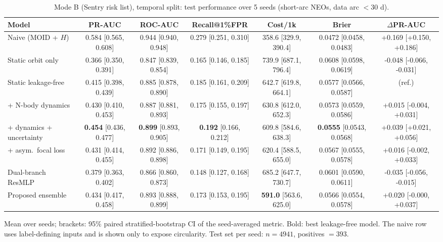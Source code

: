 \begin{table}[t]
\centering
\small
\caption{Mode B (Sentry risk list), temporal split: test performance over 5 seeds (short-arc NEOs, data arc $<30$ d).}
\label{tab:sentry_temporal_short_arc}
\begin{tabular}{lcccccc}
\toprule
Model & PR-AUC & ROC-AUC & Recall@1\%FPR & Cost/1k & Brier & $\Delta$PR-AUC \\
\midrule
Naive (MOID + $H$) & 0.584 \scriptsize{[0.565, 0.608]} & 0.944 \scriptsize{[0.940, 0.948]} & 0.279 \scriptsize{[0.251, 0.310]} & 358.6 \scriptsize{[329.9, 390.4]} & 0.0472 \scriptsize{[0.0458, 0.0483]} & +0.169 \scriptsize{[+0.150, +0.186]} \\
\midrule
Static orbit only & 0.366 \scriptsize{[0.350, 0.391]} & 0.847 \scriptsize{[0.839, 0.854]} & 0.165 \scriptsize{[0.146, 0.185]} & 739.9 \scriptsize{[687.1, 796.4]} & 0.0608 \scriptsize{[0.0598, 0.0619]} & -0.048 \scriptsize{[-0.066, -0.031]} \\
Static leakage-free & 0.415 \scriptsize{[0.398, 0.439]} & 0.885 \scriptsize{[0.878, 0.890]} & 0.185 \scriptsize{[0.161, 0.209]} & 642.7 \scriptsize{[619.8, 664.1]} & 0.0577 \scriptsize{[0.0566, 0.0587]} & (ref.) \\
+ N-body dynamics & 0.430 \scriptsize{[0.410, 0.453]} & 0.887 \scriptsize{[0.881, 0.893]} & 0.175 \scriptsize{[0.155, 0.197]} & 630.8 \scriptsize{[612.0, 652.3]} & 0.0573 \scriptsize{[0.0559, 0.0586]} & +0.015 \scriptsize{[-0.004, +0.031]} \\
+ dynamics + uncertainty & \textbf{0.454} \scriptsize{[0.436, 0.477]} & \textbf{0.899} \scriptsize{[0.893, 0.905]} & \textbf{0.192} \scriptsize{[0.166, 0.212]} & 609.8 \scriptsize{[584.6, 638.3]} & \textbf{0.0555} \scriptsize{[0.0543, 0.0568]} & +0.039 \scriptsize{[+0.021, +0.056]} \\
+ asym.\ focal loss & 0.431 \scriptsize{[0.414, 0.455]} & 0.892 \scriptsize{[0.886, 0.898]} & 0.171 \scriptsize{[0.149, 0.195]} & 620.4 \scriptsize{[588.5, 655.0]} & 0.0567 \scriptsize{[0.0555, 0.0578]} & +0.016 \scriptsize{[-0.002, +0.033]} \\
Dual-branch ResMLP & 0.379 \scriptsize{[0.363, 0.402]} & 0.866 \scriptsize{[0.860, 0.873]} & 0.148 \scriptsize{[0.127, 0.168]} & 685.2 \scriptsize{[647.7, 730.7]} & 0.0601 \scriptsize{[0.0590, 0.0611]} & -0.035 \scriptsize{[-0.056, -0.015]} \\
Proposed ensemble & 0.434 \scriptsize{[0.417, 0.458]} & 0.893 \scriptsize{[0.888, 0.899]} & 0.173 \scriptsize{[0.153, 0.195]} & \textbf{591.0} \scriptsize{[563.6, 625.0]} & 0.0566 \scriptsize{[0.0554, 0.0578]} & +0.020 \scriptsize{[-0.000, +0.037]} \\
\bottomrule
\end{tabular}
\par\vspace{2pt}\footnotesize Mean over seeds; brackets: 95\% paired stratified-bootstrap CI of the seed-averaged metric. Bold: best leakage-free model. The naive row uses label-defining inputs and is shown only to expose circularity. Test set per seed: $n=4941$, positives $=393$.
\end{table}
